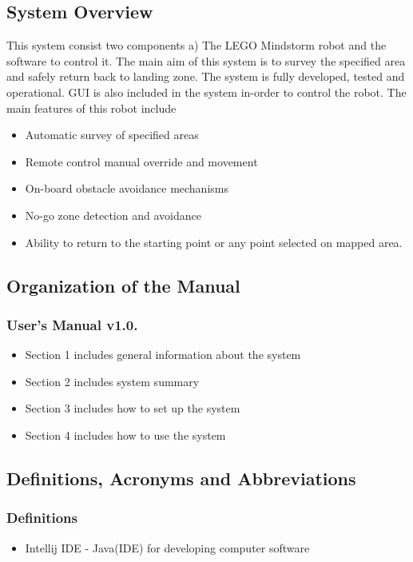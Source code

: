 \documentclass[10pt,a4paper,titlepage]{article}
\begin{document}
		\subsection{System Overview}
        This system consist two components a) The LEGO Mindstorm robot and the software to control it. The main aim of this system is to survey the specified area and safely return back to landing zone. The system is fully developed, tested and operational. GUI is also included in the system in-order to control the robot.
        The main features of this robot include
	\begin{itemize}
		\item Automatic survey of specified areas
		\item Remote control manual override and movement
		\item On-board obstacle avoidance mechanisms 
		\item No-go zone detection and avoidance
		\item Ability to return to the starting point or any point selected on mapped area.
\end{itemize}
   

        \subsection{Organization of the Manual}
        \subsubsection{User’s Manual v1.0.}
        \begin{itemize}
		\item Section 1 includes general information about the system
		\item Section 2 includes system summary
		\item Section 3 includes how to set up the system
		\item Section 4 includes how to use the system
\end{itemize}
        \subsection{Definitions, Acronyms and Abbreviations}
        \subsubsection{Definitions}
\begin{itemize}
\item Intellij IDE - Java(IDE) for developing computer software
\end{itemize}
\end{document}
